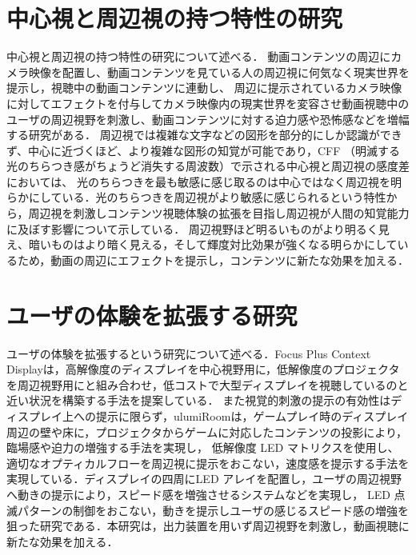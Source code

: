 \section{中心視と周辺視の持つ特性の研究}
中心視と周辺視の持つ特性の研究について述べる．
動画コンテンツの周辺にカメラ映像を配置し、動画コンテンツを見ている人の周辺視に何気なく現実世界を提示し，視聴中の動画コンテンツに連動し、
周辺に提示されているカメラ映像に対してエフェクトを付与してカメラ映像内の現実世界を変容させ動画視聴中のユーザの周辺視野を刺激し、動画コンテンツに対する迫力感や恐怖感などを増幅する研究がある\cite{shamo4}．
周辺視では複雑な文字などの図形を部分的にしか認識ができず、中心に近づくほど、より複雑な図形の知覚が可能であり\cite{shamo5}，CFF （明滅する光のちらつき感がちょうど消失する周波数）で示される中心視と周辺視の感度差においては、
光のちらつきを最も敏感に感じ取るのは中心ではなく周辺視を明らかにしている\cite{shamo6}．光のちらつきを周辺視がより敏感に感じられるという特性から，周辺視を刺激しコンテンツ視聴体験の拡張を目指し周辺視が人間の知覚能力に及ぼす影響について示している\cite{shamo7}．
周辺視野ほど明るいものがより明るく見え、暗いものはより暗く見える，そして輝度対比効果が強くなる明らかにしているため\cite{shamo8}，動画の周辺にエフェクトを提示し，コンテンツに新たな効果を加える．

\section{ユーザの体験を拡張する研究}
ユーザの体験を拡張するという研究について述べる．Focus Plus Context Displayは，高解像度のディスプレイを中心視野用に，低解像度のプロジェクタを周辺視野用にと組み合わせ，低コストで大型ディスプレイを視聴しているのと近い状況を構築する手法を提案している\cite{shamo9}．
また視覚的刺激の提示の有効性はディスプレイ上への提示に限らず，ulumiRoomは，ゲームプレイ時のディスプレイ周辺の壁や床に，プロジェクタからゲームに対応したコンテンツの投影により，臨場感や迫力の増強する手法を実現し\cite{shamo10}，
低解像度 LED マトリクスを使用し、適切なオプティカルフローを周辺視に提示をおこない，速度感を提示する手法を実現している\cite{shamo11}．ディスプレイの四周にLED アレイを配置し，ユーザの周辺視野へ動きの提示により，スピード感を増強させるシステムなどを実現し，
LED 点滅パターンの制御をおこない，動きを提示しユーザの感じるスピード感の増強を狙った研究である\cite{shamo12}．本研究は，出力装置を用いず周辺視野を刺激し，動画視聴に新たな効果を加える．
